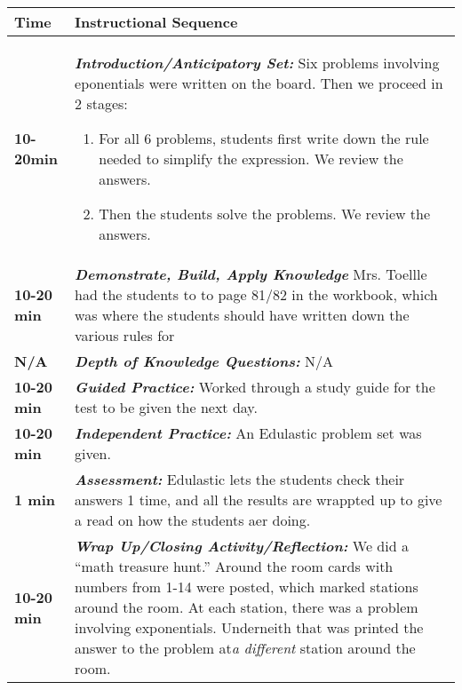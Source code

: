 \pagebreak

\begin{tabularx}{\textwidth}{|p{0.5in}|X|}
  \hline
  \centerline{\textbf{\large Time}} &  \textbf{\large Instructional Sequence } \\
  \hline
  \textbf{10-20min} &  \textbf{\em Introduction/Anticipatory Set:}  Six problems involving eponentials were written on the board.   Then we proceed in 2 stages:
         {\begin{enumerate}
           \item For all 6 problems, students first write down the rule needed to simplify the expression.  We review the answers.
           \item Then the students solve the problems.  We review the answers.
         \end{enumerate}}\\
         \hline
         \textbf{10-20 min} &  \textbf{\em Demonstrate, Build, Apply Knowledge} Mrs. Toellle had the students to to page 81/82 in the workbook, which was where the students should have written down the various rules for \\
  \hline
  \textbf{N/A} &  \textbf{\em Depth of Knowledge Questions:} N/A \\
  \hline
  \textbf{10-20 min} &  \textbf{\em Guided Practice:} Worked through a study guide for the test to be given the next day. \\
  \hline
  \textbf{10-20 min} &  \textbf{\em Independent Practice:} An Edulastic problem set was given. \\
  \hline
  \textbf{1 min} &  \textbf{\em Assessment:} Edulastic lets the students check their answers 1 time, and all the results are wrappted up to give a read on how the students aer doing. \\
  \hline
  \textbf{10-20 min} &  \textbf{\em Wrap Up/Closing Activity/Reflection:} We did a ``math treasure hunt.''   Around the room cards with numbers from 1-14 were posted, which marked stations around the room.  At each station, there was a problem involving exponentials.  Underneith that was printed the answer to the problem at{\em a different} station around the room.   \\
  \hline
\end{tabularx}

\vskip 6pt

